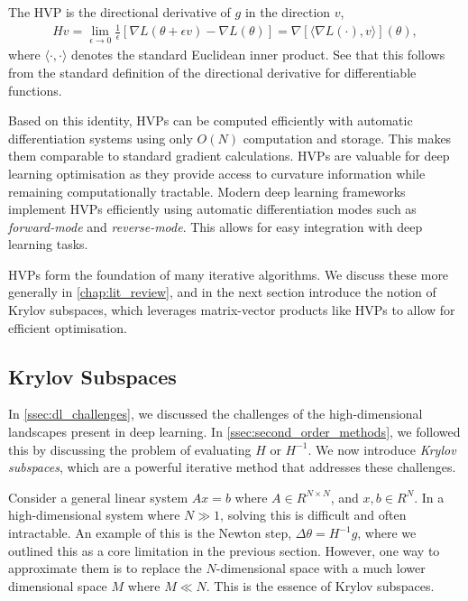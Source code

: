 \begin{definition} The HVP is the directional derivative of $g$ in the direction $v$,
\begin{align}
    Hv = \lim_{\epsilon \to 0} \frac{1}{\epsilon}[\nabla L(\theta + \epsilon v) - \nabla L(\theta)] = \nabla[\langle\nabla L(\cdot), v\rangle](\theta), 
\end{align} 
where $\langle \cdot, \cdot \rangle$ denotes the standard Euclidean inner product. See that this follows from the standard definition of the directional derivative for differentiable functions.
\end{definition}
Based on this identity, HVPs can be computed efficiently with automatic differentiation systems using only $O(N)$ computation and storage. This makes them comparable to standard gradient calculations. HVPs are valuable for deep learning optimisation as they provide access to curvature information while remaining computationally tractable. Modern deep learning frameworks implement HVPs efficiently using automatic differentiation modes such as \textit{forward-mode} and \textit{reverse-mode}. This allows for easy integration with deep learning tasks.

HVPs form the foundation of many iterative algorithms. We discuss these more generally in \cref{chap:lit_review}, and in the next section introduce the notion of Krylov subspaces, which leverages matrix-vector products like HVPs to allow for efficient optimisation.

\subsection{Krylov Subspaces}
\label{ssec:krylov_subspaces}

In \cref{ssec:dl_challenges}, we discussed the challenges of the high-dimensional landscapes present in deep learning. In \cref{ssec:second_order_methods}, we followed this by discussing the problem of evaluating $H$ or $H^{-1}$. We now introduce \textit{Krylov subspaces}, which are a powerful iterative method that addresses these challenges.

Consider a general linear system $Ax = b$ where $A \in R^{N \times N}$, and $x, b \in R^{N}$. In a high-dimensional system where $N \gg 1$, solving this is difficult and often intractable. An example of this is the Newton step, $\Delta \theta = H^{-1} g$, where we outlined this as a core limitation in the previous section. However, one way to approximate them is to replace the $N$-dimensional space with a much lower dimensional space $M$ where $M \ll N$. This is the essence of Krylov subspaces.

